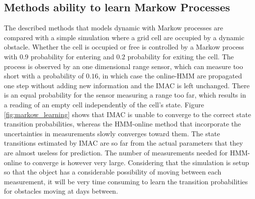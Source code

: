 \subsection{Methods ability to learn Markow Processes}
The described methods that models dynamic with Markow processes are compared with a simple simulation where a grid cell are occupied by a dynamic obstacle. 
Whether the cell is occupied or free is controlled by a Markow process with $0.9$ probability for entering and $0.2$ probability for exiting the cell. 
The process is observed by an one dimensional range sensor, which can measure too short with a probability of $0.16$, in which case the online-HMM are propagated one step without adding new information and the IMAC is left unchanged.
There is an equal probability for the sensor measuring a range too far, which results in a reading of an empty cell independently of the cell's state. 
Figure \ref{fig:markow_learning} shows that IMAC is unable to converge to the correct state transition probabilities, whereas the HMM-online method that incorporate the uncertainties in measurements slowly converges toward them.
The state transitions estimated by IMAC are so far from the actual parameters that they are almost useless for prediction. 
The number of measurements needed for HMM-online to converge is however very large.
Considering that the simulation is setup so that the object has a considerable possibility of moving between each measurement, it will be very time consuming to learn the transition probabilities for obstacles moving at days between.

